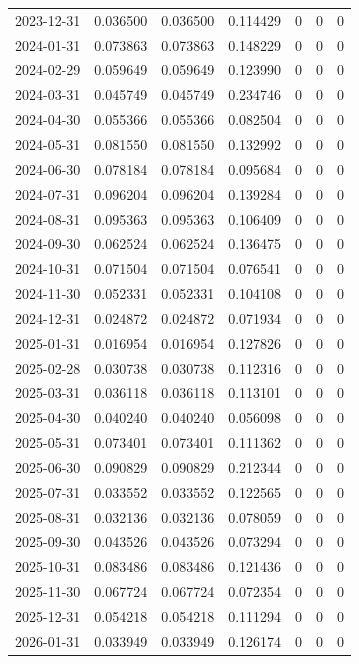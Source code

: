 \documentclass[conference,onecolumn]{IEEEtran}
\begin{document}
\begin{longtable}{|c|c|c|c|c|c|c|}
2023-12-31 & 0.036500 & 0.036500 & 0.114429 & 0 & 0 & 0 \\
2024-01-31 & 0.073863 & 0.073863 & 0.148229 & 0 & 0 & 0 \\
2024-02-29 & 0.059649 & 0.059649 & 0.123990 & 0 & 0 & 0 \\
2024-03-31 & 0.045749 & 0.045749 & 0.234746 & 0 & 0 & 0 \\
2024-04-30 & 0.055366 & 0.055366 & 0.082504 & 0 & 0 & 0 \\
2024-05-31 & 0.081550 & 0.081550 & 0.132992 & 0 & 0 & 0 \\
2024-06-30 & 0.078184 & 0.078184 & 0.095684 & 0 & 0 & 0 \\
2024-07-31 & 0.096204 & 0.096204 & 0.139284 & 0 & 0 & 0 \\
2024-08-31 & 0.095363 & 0.095363 & 0.106409 & 0 & 0 & 0 \\
2024-09-30 & 0.062524 & 0.062524 & 0.136475 & 0 & 0 & 0 \\
2024-10-31 & 0.071504 & 0.071504 & 0.076541 & 0 & 0 & 0 \\
2024-11-30 & 0.052331 & 0.052331 & 0.104108 & 0 & 0 & 0 \\
2024-12-31 & 0.024872 & 0.024872 & 0.071934 & 0 & 0 & 0 \\
2025-01-31 & 0.016954 & 0.016954 & 0.127826 & 0 & 0 & 0 \\
2025-02-28 & 0.030738 & 0.030738 & 0.112316 & 0 & 0 & 0 \\
2025-03-31 & 0.036118 & 0.036118 & 0.113101 & 0 & 0 & 0 \\
2025-04-30 & 0.040240 & 0.040240 & 0.056098 & 0 & 0 & 0 \\
2025-05-31 & 0.073401 & 0.073401 & 0.111362 & 0 & 0 & 0 \\
2025-06-30 & 0.090829 & 0.090829 & 0.212344 & 0 & 0 & 0 \\
2025-07-31 & 0.033552 & 0.033552 & 0.122565 & 0 & 0 & 0 \\
2025-08-31 & 0.032136 & 0.032136 & 0.078059 & 0 & 0 & 0 \\
2025-09-30 & 0.043526 & 0.043526 & 0.073294 & 0 & 0 & 0 \\
2025-10-31 & 0.083486 & 0.083486 & 0.121436 & 0 & 0 & 0 \\
2025-11-30 & 0.067724 & 0.067724 & 0.072354 & 0 & 0 & 0 \\
2025-12-31 & 0.054218 & 0.054218 & 0.111294 & 0 & 0 & 0 \\
2026-01-31 & 0.033949 & 0.033949 & 0.126174 & 0 & 0 & 0 \\
\end{longtable}
\end{document}

